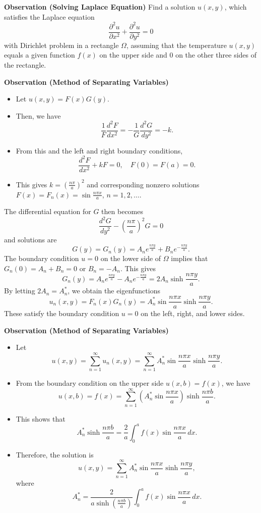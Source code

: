 \documentclass[12pt,openany]{book}
\theoremstyle{definition}
\begin{document}
	\textbf{Observation (Solving Laplace Equation)}
	Find a solution \( u(x, y) \), which satisfies the Laplace equation
	\[
	\frac{\partial^2 u}{\partial x^2} + \frac{\partial^2 u}{\partial y^2} = 0
	\]
	with Dirichlet problem in a rectangle \( \Omega \), assuming that the temperature \( u(x, y) \) equals a given function \( f(x) \) on the upper side and 0 on the other three sides of the rectangle.
	
	\textbf{Observation (Method of Separating Variables)}
	\begin{itemize}
		\item Let \( u(x, y) = F(x)G(y) \).
		\item Then, we have
		\[
		\frac{1}{F} \frac{d^2 F}{dx^2} = -\frac{1}{G} \frac{d^2 G}{dy^2} = -k.
		\]
		\item From this and the left and right boundary conditions,
		\[
		\frac{d^2 F}{dx^2} + kF = 0, \quad F(0) = F(a) = 0.
		\]
		\item This gives \( k = \left( \frac{n\pi}{a} \right)^2 \) and corresponding nonzero solutions \( F(x) = F_n(x) = \sin \frac{n\pi x}{a} \), \( n = 1,2,\ldots \).
	\end{itemize}
	
	The differential equation for \( G \) then becomes
	\[
	\frac{d^2 G}{dy^2} - \left( \frac{n\pi}{a} \right)^2 G = 0
	\]
	and solutions are
	\[
	G(y) = G_n(y) = A_n e^{\frac{n\pi y}{a}} + B_n e^{-\frac{n\pi y}{a}}.
	\]
	The boundary condition \( u = 0 \) on the lower side of \( \Omega \) implies that \( G_n(0) = A_n + B_n = 0 \) or \( B_n = -A_n \). This gives
	\[
	G_n(y) = A_n e^{\frac{n\pi y}{a}} - A_n e^{-\frac{n\pi y}{a}} = 2A_n \sinh \frac{n\pi y}{a}.
	\]
	By letting \( 2A_n = A_n^* \), we obtain the eigenfunctions
	\[
	u_n(x, y) = F_n(x)G_n(y) = A_n^* \sin \frac{n\pi x}{a} \sinh \frac{n\pi y}{a}.
	\]
	These satisfy the boundary condition \( u = 0 \) on the left, right, and lower sides.
	
	
	\textbf{Observation (Method of Separating Variables)}
	
	\begin{itemize}
		\item Let
		\[
		u(x, y) = \sum_{n=1}^{\infty} u_n(x, y) = \sum_{n=1}^{\infty} A_n^* \sin \frac{n\pi x}{a} \sinh \frac{n\pi y}{a}.
		\]
		
		\item From the boundary condition on the upper side \( u(x, b) = f(x) \), we have
		\[
		u(x, b) = f(x) = \sum_{n=1}^{\infty} \left( A_n^* \sin \frac{n\pi x}{a} \right) \sinh \frac{n\pi b}{a}.
		\]
		
		\item This shows that
		\[
		A_n^* \sinh \frac{n\pi b}{a} = \frac{2}{a} \int_{0}^{a} f(x) \sin \frac{n\pi x}{a} \, dx.
		\]
		
		\item Therefore, the solution is
		\[
		u(x, y) = \sum_{n=1}^{\infty} A_n^* \sin \frac{n\pi x}{a} \sinh \frac{n\pi y}{a},
		\]
		where
		\[
		A_n^* = \frac{2}{a \sinh \left( \frac{n\pi b}{a} \right)} \int_{0}^{a} f(x) \sin \frac{n\pi x}{a} \, dx.
		\]
	\end{itemize}
	
\end{document}
